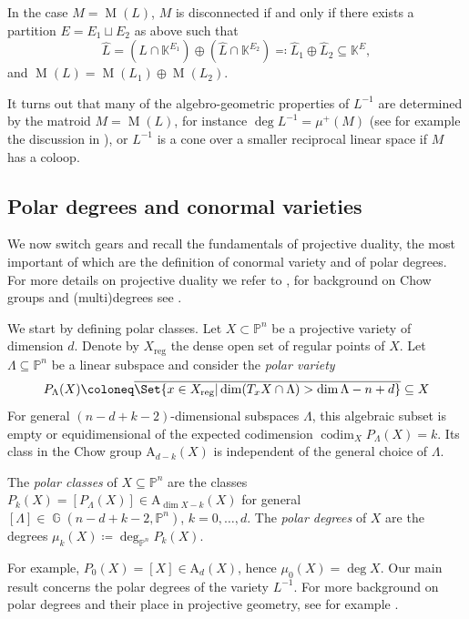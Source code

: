 \documentclass[12pt,a4paper,english]{scrartcl}
\newcommand{\KK}{\mathbb{K}}
\newcommand{\PP}{\mathbb{P}}
\DeclareMathOperator{\codim}{codim}
\newcommand{\reg}{\mathrm{reg}}
\DeclareMathOperator{\Matroid}{M}
\DeclareMathOperator{\PGr}{\mathbb{G}}
\newcommand{\ChowGrp}{\mathrm{A}}
\begin{document}
In the case $M = \Matroid(L)$, $M$ is disconnected if and only if there exists a partition $E = E_1 \sqcup E_2$ as above such that
\[
\widehat{L} = (\widehat{L} \cap \KK^{E_1}) \oplus (\widehat{L}\cap \KK^{E_2}) \eqcolon \widehat{L}_1 \oplus \widehat{L}_2 \subseteq \KK^E,
\]
and $\Matroid(L) = \Matroid(L_1) \oplus \Matroid(L_2)$.

It turns out that many of the algebro-geometric properties of $L^{-1}$ are determined by the matroid $M=\Matroid(L)$, for instance $\deg L^{-1} = \mu^+(M)$ (see for example the discussion in ), or $L^{-1}$ is a cone over a smaller reciprocal linear space if $M$ has a coloop.

\subsection{Polar degrees and conormal varieties}

We now switch gears and recall the fundamentals of projective duality, the most important of which are the definition of conormal variety and of polar degrees. For more details on projective duality we refer to \cite{GKZ},  for background on Chow groups and (multi)degrees see \cite{Fulton1998}.

We start by defining polar classes. Let $X \subset \PP^n$ be a projective variety of dimension $d$. Denote by $X_\reg$ the dense open set of regular points of $X$. Let $\Lambda \subseteq \PP^n$ be a linear subspace and consider the \emph{polar variety}
\[
P_\Lambda(X) \coloneq \overline{\Set{x\in X_\reg | \dim(T_xX \cap \Lambda) > \dim \Lambda - n + d}} \subseteq X
\]
For general $(n-d+k-2)$-dimensional subspaces $\Lambda$, this algebraic subset is empty or equidimensional of the expected codimension $\codim_X P_\Lambda(X) = k$. Its class in the Chow group $\ChowGrp_{d-k}(X)$ is independent of the general choice of $\Lambda$.

\begin{definition}
The \emph{polar classes} of $X \subseteq \PP^n$ are the classes $P_k(X) = [P_\Lambda(X)] \in \ChowGrp_{\dim X-k}(X)$ for general $[\Lambda] \in \PGr(n-d+k-2,\PP^n)$, $k=0,\dots,d$. The \emph{polar degrees} of $X$ are the degrees $\mu_k(X) \coloneq\deg_{\PP^n} P_k(X)$.
\end{definition}

For example, $P_0(X) = [X] \in \ChowGrp_d(X)$, hence $\mu_0(X) = \deg X$. Our main result  concerns the polar degrees of the variety $L^{-1}$.
For more background on polar degrees and their place in projective geometry, see for example \cite{Piene1978,Piene1988}.
\end{document}
